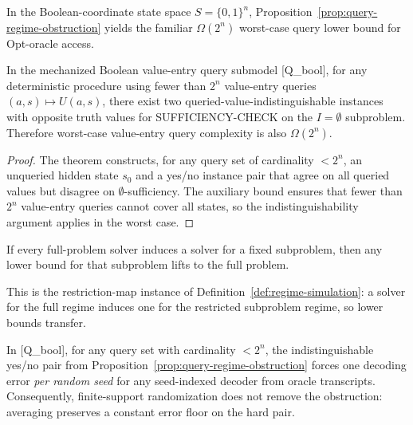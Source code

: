 \begin{corollary}\label{cor:query-obstruction-bool}
In the Boolean-coordinate state space $S=\{0,1\}^n$, Proposition~\ref{prop:query-regime-obstruction} yields the familiar $\Omega(2^n)$ worst-case query lower bound for Opt-oracle access.
\end{corollary}

\begin{proposition}\label{prop:query-value-entry-lb}
In the mechanized Boolean value-entry query submodel [Q\_bool], for any deterministic procedure using fewer than $2^n$ value-entry queries $(a,s)\mapsto U(a,s)$, there exist two queried-value-indistinguishable instances with opposite truth values for SUFFICIENCY-CHECK on the $I=\emptyset$ subproblem. Therefore worst-case value-entry query complexity is also $\Omega(2^n)$.
\end{proposition}

\begin{proof}
The theorem  constructs, for any query set of cardinality $<2^n$, an unqueried hidden state $s_0$ and a yes/no instance pair that agree on all queried values but disagree on $\emptyset$-sufficiency. The auxiliary bound  ensures that fewer than $2^n$ value-entry queries cannot cover all states, so the indistinguishability argument applies in the worst case.
\end{proof}

\begin{proposition}\label{prop:query-subproblem-transfer}
If every full-problem solver induces a solver for a fixed subproblem, then any lower bound for that subproblem lifts to the full problem.
\end{proposition}

This is the restriction-map instance of Definition~\ref{def:regime-simulation}: a solver for the full regime induces one for the restricted subproblem regime, so lower bounds transfer.

\begin{proposition}\label{prop:query-randomized-robustness}
In [Q\_bool], for any query set with cardinality $<2^n$, the indistinguishable yes/no pair from Proposition~\ref{prop:query-regime-obstruction} forces one decoding error \emph{per random seed} for any seed-indexed decoder from oracle transcripts.
Consequently, finite-support randomization does not remove the obstruction: averaging preserves a constant error floor on the hard pair.
\end{proposition}

